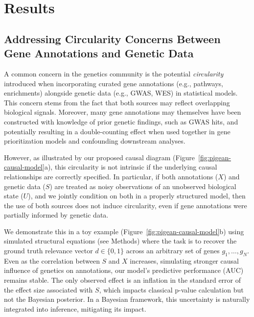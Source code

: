 \documentclass[sn-nature,lineno]{sn-jnl}%
\theoremstyle{thmstyleone}%
\theoremstyle{thmstyletwo}%
\theoremstyle{thmstylethree}%
\begin{document}
\section{Results}\label{sec:results}


\subsection{Addressing Circularity Concerns Between Gene Annotations and Genetic Data}


A common concern in the genetics community is the potential \emph{circularity} introduced when incorporating curated gene annotations (e.g., pathways, enrichments) alongside genetic data (e.g., GWAS, WES) in statistical models. This concern stems from the fact that both sources may reflect overlapping biological signals. Moreover, many gene annotations may themselves have been constructed with knowledge of prior genetic findings, such as GWAS hits, and potentially resulting in a double-counting effect when used together in gene prioritization models and confounding downstream analyses.

However, as illustrated by our proposed causal diagram (Figure~\ref{fig:pigean-causal-model}a), this circularity is not intrinsic if the underlying causal relationships are correctly specified. In particular, if both annotations ($X$) and genetic data ($S$) are treated as noisy observations of an unobserved biological state ($U$), and we jointly condition on both in a properly structured model, then the use of both sources does not induce circularity, even if gene annotations were partially informed by genetic data. 

We demonstrate this in a toy example (Figure~\ref{fig:pigean-causal-model}b) using simulated structural equations (see Methods) where the task is to recover the ground truth relevance vector $d \in \{0,1\}$ across an arbitrary set of genes $g_1, \dots, g_N$. Even as the correlation between $S$ and $X$ increases, simulating stronger causal influence of genetics on annotations, our model’s predictive performance (AUC) remains stable. The only observed effect is an inflation in the standard error of the effect size associated with $S$, which impacts classical p-value calculation but not the Bayesian posterior. In a Bayesian framework, this uncertainty is naturally integrated into inference, mitigating its impact.
\end{document}
